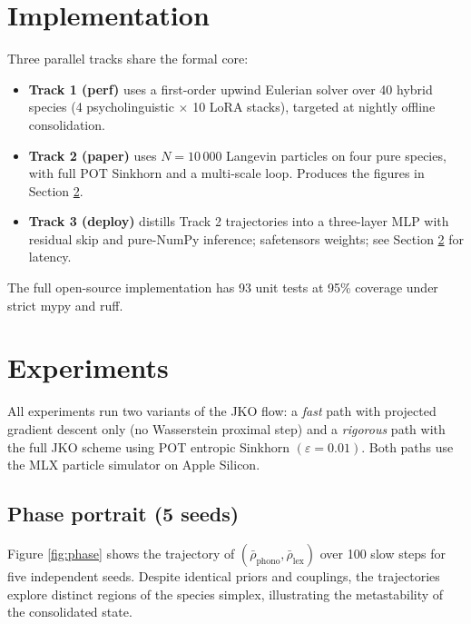 \documentclass[11pt]{article}
\begin{document}
\section{Implementation}
\label{sec:impl}

Three parallel tracks share the formal core:
\begin{itemize}
  \item \textbf{Track 1 (perf)} uses a first-order upwind Eulerian
        solver over 40 hybrid species (4 psycholinguistic $\times$ 10
        LoRA stacks), targeted at nightly offline consolidation.
  \item \textbf{Track 2 (paper)} uses $N=10\,000$ Langevin particles on
        four pure species, with full POT Sinkhorn and a multi-scale
        loop. Produces the figures in Section \ref{sec:exp}.
  \item \textbf{Track 3 (deploy)} distills Track 2 trajectories into a
        three-layer MLP with residual skip and pure-NumPy inference;
        safetensors weights; see Section \ref{sec:exp} for latency.
\end{itemize}

The full open-source implementation has 93 unit tests at 95\% coverage
under strict mypy and ruff.

\section{Experiments}
\label{sec:exp}

All experiments run two variants of the JKO flow: a \emph{fast} path with
projected gradient descent only (no Wasserstein proximal step) and a
\emph{rigorous} path with the full JKO scheme using POT entropic Sinkhorn
$(\varepsilon = 0.01)$. Both paths use the MLX particle simulator on
Apple Silicon.

\subsection{Phase portrait (5 seeds)}
Figure \ref{fig:phase} shows the trajectory of
$(\bar\rho_{\text{phono}}, \bar\rho_{\text{lex}})$ over 100 slow steps
for five independent seeds. Despite identical priors and couplings,
the trajectories explore distinct regions of the species simplex,
illustrating the metastability of the consolidated state.
\end{document}
